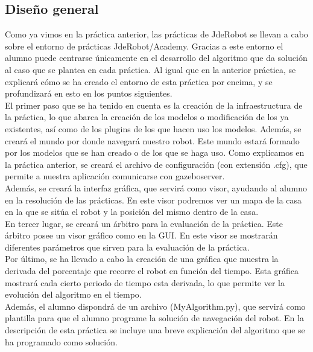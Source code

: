 \subsection{Diseño general}
Como ya vimos en la práctica anterior, las prácticas de JdeRobot se llevan a cabo sobre el entorno de prácticas JdeRobot/Academy. Gracias a este entorno el alumno puede centrarse únicamente en el desarrollo del algoritmo que da solución al caso que se plantea en cada práctica. Al igual que en la anterior práctica, se explicará cómo se ha creado el entorno de esta práctica por encima, y se profundizará en esto en los puntos siguientes. \\

El primer paso que se ha tenido en cuenta es la creación de la infraestructura de la práctica, lo que abarca la creación de los modelos o modificación de los ya existentes, así como de los plugins de los que hacen uso los modelos. Además, se creará el mundo por donde navegará nuestro robot. Este mundo estará formado por los modelos que se han creado o de los que se haga uso. Como explicamos en la práctica anterior, se creará el archivo de configuración (con extensión .cfg), que permite a nuestra aplicación comunicarse con gazeboserver.\\

Además, se creará la interfaz gráfica, que servirá como visor, ayudando al alumno en la resolución de las prácticas. En este visor podremos ver un mapa de la casa en la que se sitúa el robot y la posición del mismo dentro de la casa.\\

En tercer lugar, se creará un árbitro para la evaluación de la práctica. Este árbitro posee un visor gráfico como en la GUI. En este visor se mostrarán diferentes parámetros que sirven para la evaluación de la práctica.\\

Por último, se ha llevado a cabo la creación de una gráfica que muestra la derivada del porcentaje que recorre el robot en función del tiempo. Esta gráfica mostrará cada cierto periodo de tiempo esta derivada, lo que permite ver la evolución del algoritmo en el tiempo.\\

Además, el alumno dispondrá de un archivo (MyAlgorithm.py), que servirá como plantilla para que el alumno programe la solución de navegación del robot. En la descripción de esta práctica se incluye una breve explicación del algoritmo que se ha programado como solución.\\

